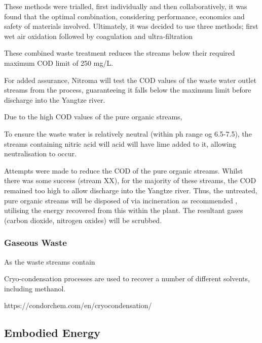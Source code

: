 These methods were trialled, first individually and then collaboratively, it was found that the optimal combination, considering performance, economics and safety of materials involved. Ultimately, it was decided to use three methods; first wet air oxidation followed by coagulation and ultra-filtration 

 These combined waste treatment reduces the streams below their required maximum COD limit of 250 mg/L. 

For added assurance, Nitroma will test the COD values of the waste water outlet streams from the process, guaranteeing it falls below the maximum limit before discharge into the Yangtze river. 

Due to the high COD values of the pure organic streams, 




To ensure the waste water is relatively neutral (within ph range og 6.5-7.5), the streams containing nitric acid will acid will have lime added to it, allowing neutralisation to occur. 

Attempts were made to reduce the COD of the pure organic streams. Whilst there was some success (stream XX), for the majority of these streams, the COD remained too high to allow discharge into the Yangtze river. Thus, the untreated, pure organic streams will be disposed of via incineration as recommended \cite{sinnott_coulson_2005}, utilising the energy recovered from this within the plant. The resultant gases (carbon dioxide, nitrogen oxides) will be scrubbed. 




\subsubsection{Gaseous Waste}

As the waste streams contain 


Cryo-condensation processes are used to recover a number of different solvents, including methanol. 

https://condorchem.com/en/cryocondensation/









\subsection{Embodied Energy}